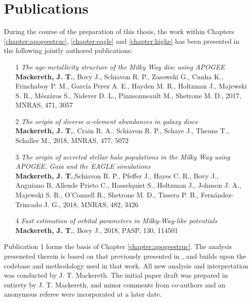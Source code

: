 \chapter*{Publications}

During the course of the preparation of this thesis, the work within Chapters \ref{chapter:apogeestruc},  \ref{chapter:eagle} and \ref{chapter:highe} has been presented in the following jointly authored publications:

\begin{itemize}

\item[1] {\it The age-metallicity structure of the Milky Way disc using APOGEE} \\
{\bf Mackereth, J. T.}, Bovy J., Schiavon R. P., Zasowski G., Cunha K., Frinchaboy P. M., Garc\'ia Perez A. E., Hayden M. R., Holtzman J., Majewski S. R., M\'esz\'aros S., Nidever D. L., Pinnsonneault M., Shetrone M. D., 2017, MNRAS, 471, 3057

\item[2] {\it The origin of diverse $\alpha$-element abundances in galaxy discs} \\
{\bf Mackereth, J. T.}, Crain R. A., Schiavon R. P., Schaye J., Theuns T., Schaller M., 2018, MNRAS, 477, 5072

\item[3] {\it The origin of accreted stellar halo populations in the Milky Way using APOGEE, Gaia and the EAGLE simulations} \\
{\bf Mackereth, J. T.},Schiavon R. P., Pfeffer J., Hayes C. R., Bovy J., Anguiano B, Allende Prieto C., Hasselquist S., Holtzman J., Johnson J. A., Majewski S. R., O'Connell R., Shetrone M. D., Tissera P. B., Fernández-Trincado J. G., 2018, MNRAS, 482, 3426


\item[4] {\it Fast estimation of orbital parameters in Milky-Way-like potentials} \\
{\bf Mackereth, J. T.}, Bovy J., 2018, PASP, 130, 114501

\end{itemize}

Publication 1 forms the basis of Chapter \ref{chapter:apogeestruc}. The analysis preseneted therein is based on that previously presented in \citet{2016ApJ...823...30B}, and builds upon the codebase and methodology used in that work. All new analysis and interpretation was conducted by J. T. Mackereth. The initial paper draft was prepared in entirety by J. T. Mackereth, and minor comments from co-authors and an anonymous referee were incorporated at a later date.


